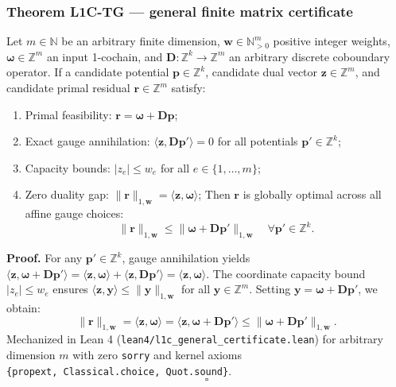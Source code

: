 \documentclass[
]{article}
\providecommand{\tightlist}{%
  \setlength{\itemsep}{0pt}\setlength{\parskip}{0pt}}
\providecommand{\tightlist}{%
  \setlength{\itemsep}{0pt}\setlength{\parskip}{0pt}}
\begin{document}
\subsubsection{Theorem L1C-TG --- general finite matrix certificate}\label{theorem-l1c-tg-general-finite-matrix-certificate}

Let \(m \in \mathbb{N}\) be an arbitrary finite dimension, \(\mathbf{w} \in \mathbb{N}_{>0}^m\) positive integer weights, \(\boldsymbol{\omega} \in \mathbb{Z}^m\) an input 1-cochain, and \(\mathbf{D}: \mathbb{Z}^k \to \mathbb{Z}^m\) an arbitrary discrete coboundary operator.
If a candidate potential \(\mathbf{p} \in \mathbb{Z}^k\), candidate dual vector \(\mathbf{z} \in \mathbb{Z}^m\), and candidate primal residual \(\mathbf{r} \in \mathbb{Z}^m\) satisfy:

\begin{enumerate}
\def\labelenumi{\arabic{enumi}.}
\tightlist
\item
  Primal feasibility: \(\mathbf{r}=\boldsymbol{\omega}+\mathbf{D}\mathbf{p}\);
\item
  Exact gauge annihilation: \(\langle \mathbf{z}, \mathbf{D} \mathbf{p}' \rangle = 0\) for all potentials \(\mathbf{p}' \in \mathbb{Z}^k\);
\item
  Capacity bounds: \(|z_e| \le w_e\) for all \(e \in \{1, \dots, m\}\);
\item
  Zero duality gap: \(\|\mathbf{r}\|_{1, \mathbf{w}} = \langle \mathbf{z}, \boldsymbol{\omega} \rangle\);
  Then \(\mathbf{r}\) is globally optimal across all affine gauge choices:
  \[\|\mathbf{r}\|_{1, \mathbf{w}} \le \|\boldsymbol{\omega} + \mathbf{D} \mathbf{p}'\|_{1, \mathbf{w}} \quad \forall \mathbf{p}' \in \mathbb{Z}^k.\]
\end{enumerate}

\textbf{Proof.} For any \(\mathbf{p}' \in \mathbb{Z}^k\), gauge annihilation yields \(\langle \mathbf{z}, \boldsymbol{\omega} + \mathbf{D} \mathbf{p}' \rangle = \langle \mathbf{z}, \boldsymbol{\omega} \rangle + \langle \mathbf{z}, \mathbf{D} \mathbf{p}' \rangle = \langle \mathbf{z}, \boldsymbol{\omega} \rangle\).
The coordinate capacity bound \(|z_e| \le w_e\) ensures \(\langle \mathbf{z}, \mathbf{y} \rangle \le \|\mathbf{y}\|_{1, \mathbf{w}}\) for all \(\mathbf{y} \in \mathbb{Z}^m\).
Setting \(\mathbf{y} = \boldsymbol{\omega} + \mathbf{D} \mathbf{p}'\), we obtain:
\[\|\mathbf{r}\|_{1, \mathbf{w}} = \langle \mathbf{z}, \boldsymbol{\omega} \rangle = \langle \mathbf{z}, \boldsymbol{\omega} + \mathbf{D} \mathbf{p}' \rangle \le \|\boldsymbol{\omega} + \mathbf{D} \mathbf{p}'\|_{1, \mathbf{w}}.\]
Mechanized in Lean 4 (\texttt{lean4/l1c\_general\_certificate.lean}) for arbitrary dimension \(m\) with zero \texttt{sorry} and kernel axioms \texttt{\{propext,\ Classical.choice,\ Quot.sound\}}. \[\square\]
\end{document}
